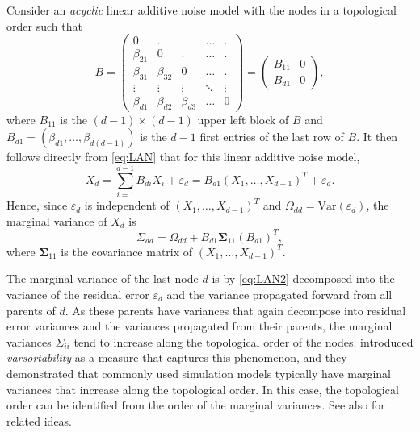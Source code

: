 \documentclass[10pt,twoside,a4paper]{amsart}
\newcommand{\bSigma}{\boldsymbol \Sigma}
\begin{document}
Consider an \emph{acyclic} linear additive noise model with the nodes in a topological order
such that 
\[
 B = \left( \begin{array}{cccccc} 
    0 & . & . & \ldots & . \\
    \beta_{21} & 0 & . & \ldots & . \\
    \beta_{31} & \beta_{32} & 0 & \ldots & . \\
    \vdots & \vdots & \vdots & \ddots & \vdots \\
    \beta_{d1} & \beta_{d2} & \beta_{d3} & \ldots & 0   
\end{array}\right) = 
\left( \begin{array}{cc} 
    B_{11} & 0 \\
    B_{d1} & 0 
\end{array}\right),
\]
where $B_{11}$ is the $(d-1) \times (d-1)$ upper left block of $B$ and $B_{d1} = (\beta_{d1}, \ldots, \beta_{d(d-1)})$ is the $d-1$ first entries of the 
last row of $B$. It then 
follows directly from \eqref{eq:LAN} that for this linear additive noise model,
\[
    X_d = \sum_{i=1}^{d-1} B_{di} X_i + \varepsilon_d = B_{d1} (X_1, \ldots, X_{d-1})^T + \varepsilon_d.
\]  
Hence, since $\varepsilon_d$ is independent of $(X_1, \ldots, X_{d-1})^T$ and 
$\Omega_{dd} = \text{Var}(\varepsilon_d)$, the marginal variance of $X_d$ is 
\begin{equation} \label{eq:LAN2}
    \Sigma_{dd} =  \Omega_{dd} + B_{d1} \bSigma_{11} (B_{d1})^T,
\end{equation}
where $\bSigma_{11}$ is the
covariance matrix of $(X_1, \ldots, X_{d-1})^T$. 

The marginal variance of the last node $d$ is by \eqref{eq:LAN2} decomposed 
into the
variance of the residual error $\varepsilon_d$ and the variance propagated
forward from all parents of $d$. As these parents have variances that again
decompose into residual error variances and the variances propagated from their
parents, the marginal variances $\Sigma_{ii}$ tend to increase along the
topological order of the nodes. \cite{reisach2021beware}
introduced \emph{varsortability} as a measure that captures this phenomenon, and they
demonstrated that commonly used simulation models typically have marginal
variances that increase along the topological order. In this case, the
topological order can be identified from the order of the marginal variances.
See also \cite{Park:2020} for related ideas. 
\end{document}
